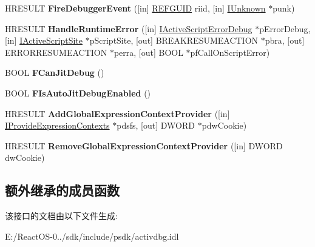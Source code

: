 \begin{DoxyCompactItemize}
\mbox{\label{interface_i_debug_application32_a1bec488bb01d485e37557e4644d88aae}} 
H\+R\+E\+S\+U\+LT {\bfseries Fire\+Debugger\+Event} (\mbox{[}in\mbox{]} \hyperlink{struct___g_u_i_d}{R\+E\+F\+G\+U\+ID} riid, \mbox{[}in\mbox{]} \hyperlink{interface_i_unknown}{I\+Unknown} $\ast$punk)
\item 
\mbox{\label{interface_i_debug_application32_a1e1446881f7c4ae0c69c7cef70ea74d3}} 
H\+R\+E\+S\+U\+LT {\bfseries Handle\+Runtime\+Error} (\mbox{[}in\mbox{]} \hyperlink{interface_i_active_script_error_debug}{I\+Active\+Script\+Error\+Debug} $\ast$p\+Error\+Debug, \mbox{[}in\mbox{]} \hyperlink{interface_i_active_script_site}{I\+Active\+Script\+Site} $\ast$p\+Script\+Site, \mbox{[}out\mbox{]} B\+R\+E\+A\+K\+R\+E\+S\+U\+M\+E\+A\+C\+T\+I\+ON $\ast$pbra, \mbox{[}out\mbox{]} E\+R\+R\+O\+R\+R\+E\+S\+U\+M\+E\+A\+C\+T\+I\+ON $\ast$perra, \mbox{[}out\mbox{]} B\+O\+OL $\ast$pf\+Call\+On\+Script\+Error)
\item 
\mbox{\label{interface_i_debug_application32_a4cb72ff853f463fd9b53afcb4b297aac}} 
B\+O\+OL {\bfseries F\+Can\+Jit\+Debug} ()
\item 
\mbox{\label{interface_i_debug_application32_a5e0d37c3f6aaed45fbfae9abdcdec38b}} 
B\+O\+OL {\bfseries F\+Is\+Auto\+Jit\+Debug\+Enabled} ()
\item 
\mbox{\label{interface_i_debug_application32_a8151fd71fe8980813b3c8ef7e4bcd03b}} 
H\+R\+E\+S\+U\+LT {\bfseries Add\+Global\+Expression\+Context\+Provider} (\mbox{[}in\mbox{]} \hyperlink{interface_i_provide_expression_contexts}{I\+Provide\+Expression\+Contexts} $\ast$pdsfs, \mbox{[}out\mbox{]} D\+W\+O\+RD $\ast$pdw\+Cookie)
\item 
\mbox{\label{interface_i_debug_application32_a762b041663373e3bef90383887b53a66}} 
H\+R\+E\+S\+U\+LT {\bfseries Remove\+Global\+Expression\+Context\+Provider} (\mbox{[}in\mbox{]} D\+W\+O\+RD dw\+Cookie)
\end{DoxyCompactItemize}
\subsection*{额外继承的成员函数}


该接口的文档由以下文件生成\+:\begin{DoxyCompactItemize}
\item 
E\+:/\+React\+O\+S-\/0../sdk/include/psdk/activdbg.\+idl\end{DoxyCompactItemize}
